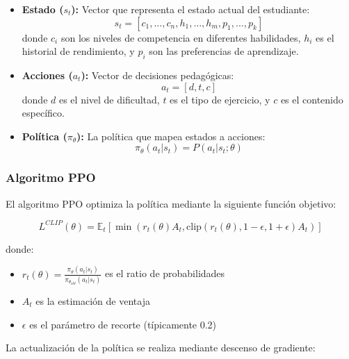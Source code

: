 \begin{itemize}
    \item \textbf{Estado ($s_t$):} Vector que representa el estado actual del estudiante:
    \begin{equation}
        s_t = [c_1, ..., c_n, h_1, ..., h_m, p_1, ..., p_k]
    \end{equation}
    donde $c_i$ son los niveles de competencia en diferentes habilidades, $h_i$ es el historial de rendimiento, y $p_i$ son las preferencias de aprendizaje.

    \item \textbf{Acciones ($a_t$):} Vector de decisiones pedagógicas:
    \begin{equation}
        a_t = [d, t, c]
    \end{equation}
    donde $d$ es el nivel de dificultad, $t$ es el tipo de ejercicio, y $c$ es el contenido específico.

    \item \textbf{Política ($\pi_\theta$):} La política que mapea estados a acciones:
    \begin{equation}
        \pi_\theta(a_t|s_t) = P(a_t|s_t; \theta)
    \end{equation}
\end{itemize}

\subsubsection{Algoritmo PPO}

El algoritmo PPO optimiza la política mediante la siguiente función objetivo:

\begin{equation}
    \label{eq:ppo-objective}
    L^{CLIP}(\theta) = \mathbb{E}_t[\min(r_t(\theta)A_t, \text{clip}(r_t(\theta), 1-\epsilon, 1+\epsilon)A_t)]
\end{equation}

donde:
\begin{itemize}
    \item $r_t(\theta) = \frac{\pi_\theta(a_t|s_t)}{\pi_{\theta_{old}}(a_t|s_t)}$ es el ratio de probabilidades
    \item $A_t$ es la estimación de ventaja
    \item $\epsilon$ es el parámetro de recorte (típicamente 0.2)
\end{itemize}

La actualización de la política se realiza mediante descenso de gradiente:

